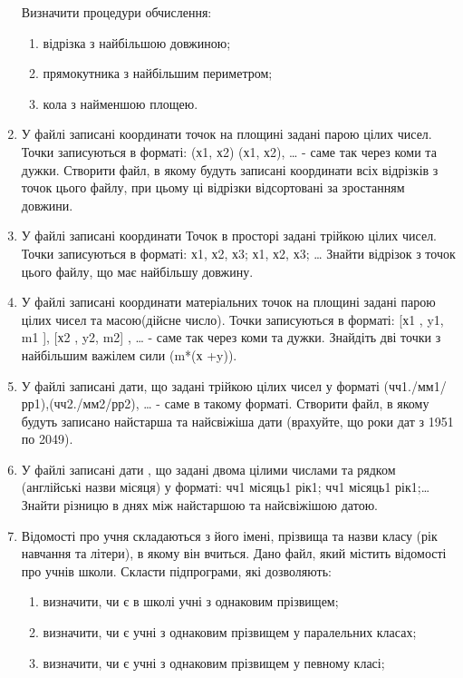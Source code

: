 \documentclass[]{article}
\makeatletter
\newcommand{\xslalph}[1]{\expandafter\@xslalph\csname c@#1\endcsname}
\newcommand{\@xslalph}[1]{%
    \ifcase#1\or а\or б\or в\or г\or д\or e\or є\or ж\or з\or i%
    \or й\or к\or л\or м\or н\or о\or п\or р\or с\or т%
    \or у\or ф\or х\or ц\or ч\or ш\or ю\or я\or аа\or бб\or вв %
    \else\@ctrerr\fi%
}
\makeatother
\begin{document}
\begin{enumerate}
Визначити процедури обчислення:
\begin{enumerate}[label=\xslalph*)]
\item
відрізка з найбільшою довжиною;

\item прямокутника з найбільшим периметром;

\item кола з найменшою площею.
\end{enumerate}

\item
У файлі записані координати точок на площині задані парою цілих чисел.
Точки записуються в форматі: (х1, х2) (х1, х2), \ldots{} - саме так
через коми та дужки. Створити файл, в якому будуть записані координати
всіх відрізків з точок цього файлу, при цьому ці відрізки відсортовані
за зростанням довжини.
\item
У файлі записані координати Точок в просторі задані трійкою цілих чисел.
Точки записуються в форматі: х1, х2, х3; х1, х2, х3; \ldots{} Знайти
відрізок з точок цього файлу, що має найбільшу довжину.
\item
У файлі записані координати матеріальних точок на площині задані парою
цілих чисел та масою(дійсне число). Точки записуються в форматі: {[}х1 ,
y1, m1 {]}, {[}х2 , y2, m2{]} , \ldots{} - саме так через коми та дужки.
Знайдіть дві точки з найбільшим важілем сили (m*(х +y)).
\item
У файлі записані дати, що задані трійкою цілих чисел у форматі
(чч1./мм1/рр1),(чч2./мм2/рр2), \ldots{} - саме в такому форматі.
Створити файл, в якому будуть записано найстарша та найсвіжіша дати
(врахуйте, що роки дат з 1951 по 2049).
\item
У файлі записані дати , що задані двома цілими числами та рядком
(англійські назви місяця) у форматі: чч1 місяць1 рік1; чч1 місяць1
рік1;\ldots{} Знайти різницю в днях між найстаршою та найсвіжішою датою.
\item
Відомості про учня складаються з його імені, прізвища та назви класу
(рік навчання та літери), в якому він вчиться. Дано файл, який містить
відомості про учнів школи. Скласти підпрограми, які дозволяють:
\begin{enumerate}[label=\xslalph*)]
\item
 визначити, чи є в школі учні з однаковим прізвищем;

\item визначити, чи є учні з однаковим прізвищем у паралельних класах;

\item визначити, чи є учні з однаковим прізвищем у певному класі;


\end{enumerate}
\end{enumerate}
\end{document}
